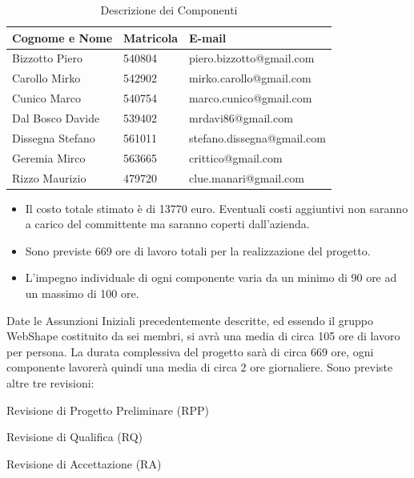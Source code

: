 \begin{table}[h]
	\begin{center}
		  \begin{tabular}{|p{}|l|l|}
		 \hline 
		 \textbf{Cognome e Nome} & \textbf{Matricola} & \textbf{E-mail}\\
		 \hline
		Bizzotto Piero & 540804 & piero.bizzotto@gmail.com \\
		\hline
		Carollo Mirko & 542902 & mirko.carollo@gmail.com\\
		\hline
		Cunico Marco & 540754 & marco.cunico@gmail.com\\
		\hline
		Dal Bosco Davide & 539402 & mrdavi86@gmail.com\\
		\hline
		Dissegna Stefano & 561011 & stefano.dissegna@gmail.com \\
		\hline
		Geremia Mirco & 563665 & crittico@gmail.com\\
		\hline
		Rizzo Maurizio & 479720 & clue.manari@gmail.com\\
		\hline
		\end{tabular}
	\caption{Descrizione dei Componenti} 
	\label{tab:tabella_componenti}
	\end{center}	
\end{table}


\begin{itemize}
\item Il costo totale stimato \`e di 13770 euro. Eventuali costi aggiuntivi non saranno a carico del committente ma saranno coperti dall'azienda.
\item Sono previste 669 ore di lavoro totali per la realizzazione del progetto.
\item L'impegno individuale di ogni componente varia da un minimo di 90 ore ad un massimo di 100 ore.
\end{itemize}


Date le Assunzioni Iniziali precedentemente descritte, ed essendo il gruppo WebShape costituito da sei membri, si avr\`a una media di circa 105 ore di lavoro per persona. La durata complessiva del progetto sar\`a di circa 669 ore, ogni componente lavorer\`a quindi una media di circa 2 ore giornaliere. Sono previste altre tre revisioni:
\begin{elenconumerato}{\normindent}
				\item Revisione di Progetto Preliminare (RPP)
				\item Revisione di Qualifica (RQ)
				\item Revisione di Accettazione (RA)
			\end{elenconumerato}

